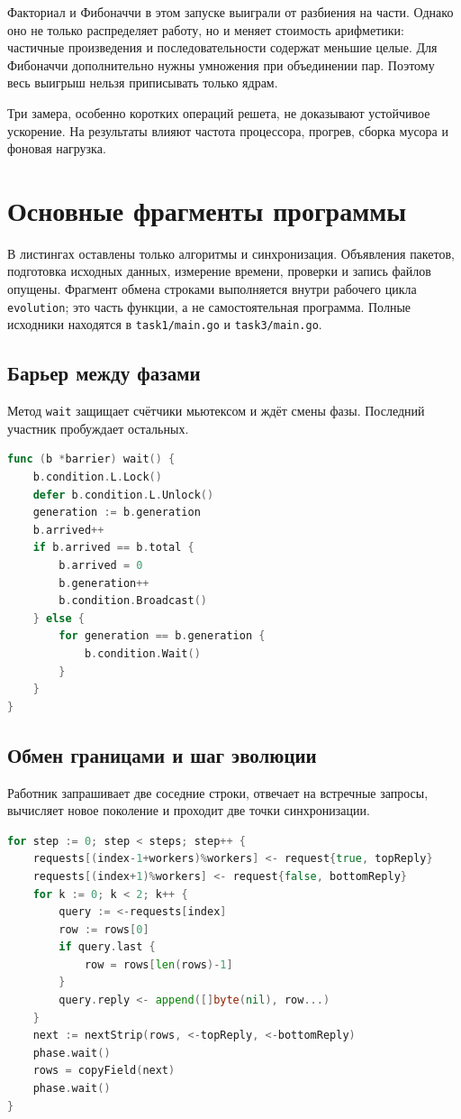 \documentclass[a4paper,14pt]{extarticle}
\begin{document}
Факториал и Фибоначчи в этом запуске выиграли от разбиения на части.
Однако оно не только распределяет работу, но и меняет стоимость
арифметики: частичные произведения и последовательности содержат
меньшие целые. Для Фибоначчи дополнительно нужны умножения при
объединении пар. Поэтому весь выигрыш нельзя приписывать только ядрам.

Три замера, особенно коротких операций решета, не доказывают устойчивое
ускорение. На результаты влияют частота процессора, прогрев,
сборка мусора и фоновая нагрузка.

\appendix
\clearpage
\section{Основные фрагменты программы}
В листингах оставлены только алгоритмы и синхронизация.
Объявления пакетов, подготовка исходных данных, измерение времени,
проверки и запись файлов опущены.
Фрагмент обмена строками выполняется внутри рабочего цикла
\texttt{evolution}; это часть функции, а не самостоятельная программа.
Полные исходники находятся в \texttt{task1/main.go} и \texttt{task3/main.go}.

\subsection{Барьер между фазами}
Метод \texttt{wait} защищает счётчики мьютексом и ждёт смены фазы.
Последний участник пробуждает остальных.
\begin{lstlisting}[language=Go,caption={Барьер между фазами}]
func (b *barrier) wait() {
	b.condition.L.Lock()
	defer b.condition.L.Unlock()
	generation := b.generation
	b.arrived++
	if b.arrived == b.total {
		b.arrived = 0
		b.generation++
		b.condition.Broadcast()
	} else {
		for generation == b.generation {
			b.condition.Wait()
		}
	}
}
\end{lstlisting}

\subsection{Обмен границами и шаг эволюции}
Работник запрашивает две соседние строки, отвечает на встречные запросы,
вычисляет новое поколение и проходит две точки синхронизации.
\begin{lstlisting}[language=Go,caption={Обмен границами и шаг эволюции}]
for step := 0; step < steps; step++ {
	requests[(index-1+workers)%workers] <- request{true, topReply}
	requests[(index+1)%workers] <- request{false, bottomReply}
	for k := 0; k < 2; k++ {
		query := <-requests[index]
		row := rows[0]
		if query.last {
			row = rows[len(rows)-1]
		}
		query.reply <- append([]byte(nil), row...)
	}
	next := nextStrip(rows, <-topReply, <-bottomReply)
	phase.wait()
	rows = copyField(next)
	phase.wait()
}
\end{lstlisting}
\end{document}
